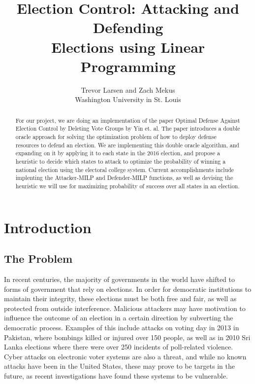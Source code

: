 \documentclass[letterpaper]{article} %
\begin{document}
%
\title{Election Control: Attacking and Defending\\ Elections using Linear Programming}
\author{Trevor Larsen and Zach Mekus\\
Washington University in St. Louis
}
\maketitle
\begin{abstract}
For our project, we are doing an implementation of the paper Optimal Defense Against Election Control by Deleting Vote Groups by Yin et. al. The paper introduces a double oracle approach for solving the optimization problem of how to deploy defense resources to defend an election. We are implementing this double oracle algorithm, and expanding on it by applying it to each state in the 2016 election, and propose a heuristic to decide which states to attack to optimize the probability of winning a national election using the electoral college system. Current accomplishments include implenting the Attacker-MILP and Defender-MILP functions, as well as devising the heuristic we will use for maximizing probability of success over all states in an election.
\end{abstract}

\section{Introduction}
\subsection{The Problem}
In recent centuries, the majority of governments in the world have shifted to forms of government that rely on elections. In order for democratic institutions to maintain their integrity, these elections must be both free and fair, as well as protected from outside interference. Malicious attackers may have motivation to influence the outcome of an election in a certain direction by subverting the democratic process. Examples of this include attacks on voting day in 2013 in Pakistan, where bombings killed or injured over 150 people, as well as in 2010 Sri Lanka elections where there were over 250 incidents of poll-related violence. Cyber attacks on electronic voter systems are also a threat, and while no known attacks have been  in the United States, these may prove to be targets in the future, as recent investigations have found these systems to be vulnerable. 
\end{document}
